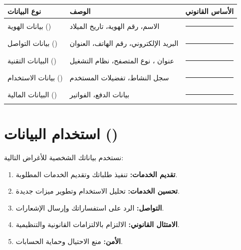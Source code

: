\documentclass[12pt,a4paper]{article}
\begin{document}
\begin{table}[H]
\centering
\renewcommand{\arraystretch}{1.5}
\begin{tabularx}{\textwidth}{L{4cm} X L{3cm}}
\toprule
\textbf{نوع البيانات} & \textbf{الوصف} & \textbf{الأساس القانوني} \\
\midrule
بيانات الهوية () & الاسم، رقم الهوية، تاريخ الميلاد & \rule{2.5cm}{0.4pt} \\
بيانات التواصل () & البريد الإلكتروني، رقم الهاتف، العنوان & \rule{2.5cm}{0.4pt} \\
البيانات التقنية () & عنوان ، نوع المتصفح، نظام التشغيل & \rule{2.5cm}{0.4pt} \\
بيانات الاستخدام () & سجل النشاط، تفضيلات المستخدم & \rule{2.5cm}{0.4pt} \\
البيانات المالية () & بيانات الدفع، الفواتير & \rule{2.5cm}{0.4pt} \\
\bottomrule
\end{tabularx}
\end{table}

\section{استخدام البيانات ()}
\label{sec:use}
نستخدم بياناتك الشخصية للأغراض التالية:
\begin{enumerate}
    \item \textbf{تقديم الخدمات:} تنفيذ طلباتك وتقديم الخدمات المطلوبة.
    \item \textbf{تحسين الخدمات:} تحليل الاستخدام وتطوير ميزات جديدة.
    \item \textbf{التواصل:} الرد على استفساراتك وإرسال الإشعارات.
    \item \textbf{الامتثال القانوني:} الالتزام بالالتزامات القانونية والتنظيمية.
    \item \textbf{الأمن:} منع الاحتيال وحماية الحسابات.
\end{enumerate}

\end{document}
